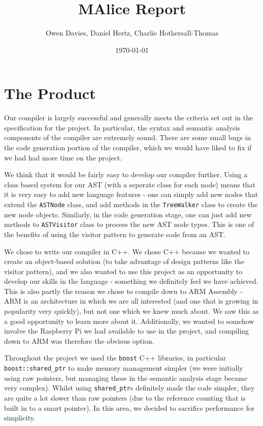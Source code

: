 \documentclass[11pt, notitlepage]{report}
\begin{document}
\title{MAlice Report}
\author{Owen Davies, Daniel Hertz, Charlie Hothersall-Thomas}
\date{\today}

\maketitle

\section*{The Product}
Our compiler is largely successful and generally meets the criteria set out in the specification for the project. In particular, the syntax and semantic analysis components of the compiler are extremely sound. There are some small bugs in the code generation portion of the compiler, which we would have liked to fix if we had had more time on the project.

We think that it would be fairly easy to develop our compiler further. Using a class based system for our AST (with a seperate class for each node) means that it is very easy to add new language features - one can simply add new nodes that extend the \texttt{ASTNode} class, and add methods in the \texttt{TreeWalker} class to create the new node objects. Similarly, in the code generation stage, one can just add new methods to \texttt{ASTVisitor} class to process the new AST node types. This is one of the benefits of using the visitor pattern to generate code from an AST.

We chose to write our compiler in C++. We chose C++ because we wanted to create an object-based solution (to take advantage of design patterns like the visitor pattern), and we also wanted to use this project as an opportunity to develop our skills in the language - something we definitely feel we have achieved. This is also partly the reason we chose to compile down to ARM Assembly - ARM is an architecture in which we are all interested (and one that is growing in popularity very quickly), but not one which we knew much about. We saw this as a good opportunity to learn more about it. Additionally, we wanted to somehow involve the Raspberry Pi we had available to use in the project, and compiling down to ARM was therefore the obvious option.

Throughout the project we used the \texttt{boost} C++ libraries, in particular \texttt{boost::shared\_ptr} to make memory management simpler (we were initially using raw pointers, but managing these in the semantic analysis stage became very complex). Whilst using \texttt{shared\_ptr}s definitely made the code simpler, they are quite a lot slower than raw pointers (due to the reference counting that is built in to a smart pointer). In this area, we decided to sacrifice performance for simplicity.
\end{document}
